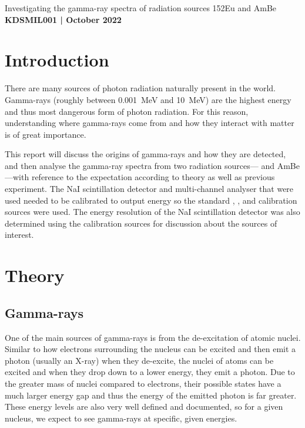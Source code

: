 \documentclass[11pt]{article}
\numberwithin{equation}{section}
\numberwithin{figure}{section}
\numberwithin{table}{section}
\begin{document}
\begin{center}
    {\huge Investigating the gamma-ray spectra of radiation sources 152Eu and AmBe}\\
    \vspace{0.2in}
    \textbf{KDSMIL001 | October 2022}
\end{center}


\section{Introduction}\label{sec:Introduction}
There are many sources of photon radiation naturally present in the world. Gamma-rays (roughly between \SI{0.001}{\mega\electronvolt} and \SI{10}{\mega\electronvolt}) are the highest energy and thus most dangerous form of photon radiation. For this reason, understanding where gamma-rays come from and how they interact with matter is of great importance. 

This report will discuss the origins of gamma-rays and how they are detected, and then analyse the gamma-ray spectra from two radiation sources--- and AmBe---with reference to the expectation according to theory as well as previous experiment. The NaI scintillation detector and multi-channel analyser that were used needed to be calibrated to output energy so the standard , , and  calibration sources were used. The energy resolution of the NaI scintillation detector was also determined using the calibration sources for discussion about the sources of interest.

\section{Theory}\label{sec:Theory}

\subsection{Gamma-rays}\label{sec:GammaTheory}
One of the main sources of gamma-rays is from the de-excitation of atomic nuclei. Similar to how electrons surrounding the nucleus can be excited and then emit a photon (usually an X-ray) when they de-excite, the nuclei of atoms can be excited and when they drop down to a lower energy, they emit a photon. Due to the greater mass of nuclei compared to electrons, their possible states have a much larger energy gap and thus the energy of the emitted photon is far greater. These energy levels are also very well defined and documented, so for a given nucleus, we expect to see gamma-rays at specific, given energies. 
\end{document}

